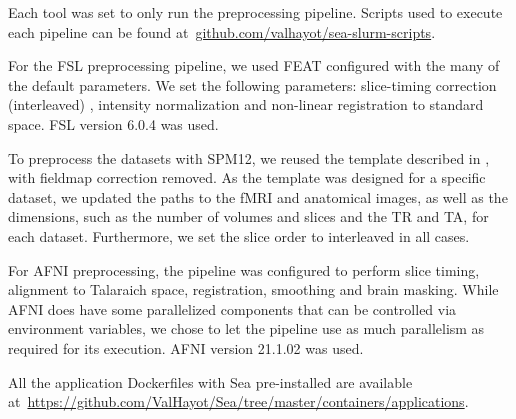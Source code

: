     Each tool was set to only run the preprocessing pipeline. Scripts used to execute each pipeline can be found at~\url{github.com/valhayot/sea-slurm-scripts}.
    
    For the FSL preprocessing pipeline, we used FEAT configured with the many of the default parameters. We set the following parameters: slice-timing correction (interleaved) , 
    intensity normalization and non-linear registration to standard space. FSL version 6.0.4 was used.
    
    To preprocess the datasets with SPM12, we reused the template described in \cite{haitas2021age}, with fieldmap correction removed.
    As the template was designed for a specific dataset, we updated the paths to the fMRI and anatomical images,
    as well as the dimensions, such as the number of volumes and slices and the TR and TA, for each dataset. Furthermore,
    we set the slice order to interleaved in all cases. 
    
    For AFNI preprocessing, the pipeline was configured to perform slice timing, alignment to Talaraich space, registration, smoothing
    and brain masking. While AFNI does have some parallelized components that can be controlled via environment variables, we chose to let 
    the pipeline use as much parallelism as required for its execution. AFNI version 21.1.02 was used.

    All the application Dockerfiles with Sea pre-installed are available at~\url{https://github.com/ValHayot/Sea/tree/master/containers/applications}.
    

    
